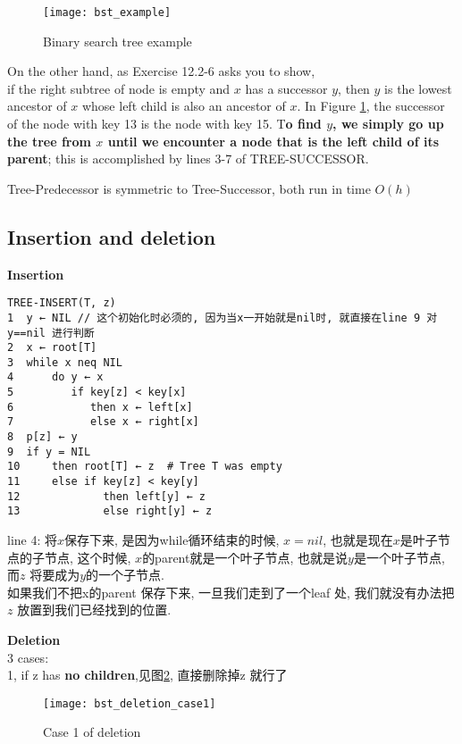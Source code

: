 \documentclass{article}
\begin{document}
\begin{figure}[htbp]
  \centering
  \texttt{[image: bst\_example]}\\
  \caption{Binary search tree example}\label{fig.bst.example}
\end{figure}

On the other hand, as Exercise 12.2-6 asks you to show, \\
if the right subtree of node is empty and $x$ has a successor $y$, then $y$ is the lowest ancestor of $x$ whose left child is also an ancestor of $x$. In Figure \ref{fig.bst.example}, the successor of the node with key 13 is the node with key 15. T\textbf{o find $y$, we simply go up the tree from $x$ until we encounter a node that is the left child of its parent}; this is accomplished by lines 3-7 of TREE-SUCCESSOR.

Tree-Predecessor is symmetric to Tree-Successor, both run in time $O(h)$

\subsection{Insertion and deletion}
\textbf{Insertion}\\
\begin{verbatim}
TREE-INSERT(T, z)
1  y ← NIL // 这个初始化时必须的, 因为当x一开始就是nil时, 就直接在line 9 对y==nil 进行判断
2  x ← root[T]
3  while x neq NIL
4      do y ← x
5         if key[z] < key[x]
6            then x ← left[x]
7            else x ← right[x]
8  p[z] ← y
9  if y = NIL
10     then root[T] ← z  # Tree T was empty
11     else if key[z] < key[y]
12             then left[y] ← z
13             else right[y] ← z
\end{verbatim}

\noindent line 4: 将$x$保存下来, 是因为while循环结束的时候, $x=nil$, 也就是现在$x$是叶子节点的子节点, 这个时候, $x$的parent就是一个叶子节点, 也就是说$y$是一个叶子节点, 而$z$ 将要成为$y$的一个子节点.\\
如果我们不把x的parent 保存下来, 一旦我们走到了一个leaf 处, 我们就没有办法把$z$ 放置到我们已经找到的位置.

\bigskip
\textbf{Deletion}\\
3 cases:\\
1, if z has \textbf{no children},见图\ref{fig.bst.deletion.case.1}, 直接删除掉z 就行了

\begin{figure}[htbp]
  \centering
  \texttt{[image: bst\_deletion\_case1]}\\
  \caption{Case 1 of deletion}\label{fig.bst.deletion.case.1}
\end{figure}
\end{document}
